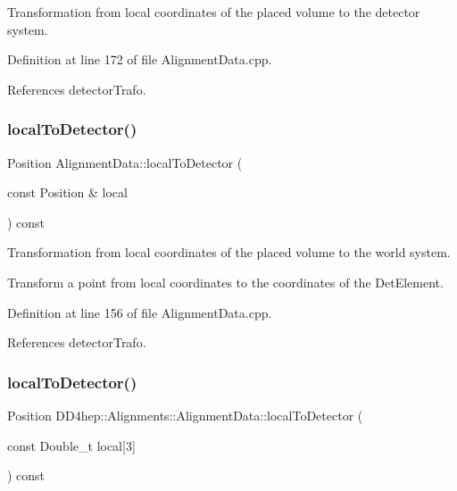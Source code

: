 Transformation from local coordinates of the placed volume to the detector system. 



Definition at line 172 of file Alignment\+Data.\+cpp.



References detector\+Trafo.

\hypertarget{class_d_d4hep_1_1_alignments_1_1_alignment_data_a686b7c5193c1d01d812b6d72f9a73c83}{}\label{class_d_d4hep_1_1_alignments_1_1_alignment_data_a686b7c5193c1d01d812b6d72f9a73c83} 
\subsubsection{\texorpdfstring{local\+To\+Detector()}{localToDetector()}\hspace{0.1cm}{\footnotesize\ttfamily [3/4]}}
{\footnotesize\ttfamily Position Alignment\+Data\+::local\+To\+Detector (\begin{DoxyParamCaption}\item[{const Position \&}]{local }\end{DoxyParamCaption}) const}



Transformation from local coordinates of the placed volume to the world system. 

Transform a point from local coordinates to the coordinates of the Det\+Element. 

Definition at line 156 of file Alignment\+Data.\+cpp.



References detector\+Trafo.

\hypertarget{class_d_d4hep_1_1_alignments_1_1_alignment_data_aa3d9d7b8ae5bf3cc2916a2fbd4d12cc4}{}\label{class_d_d4hep_1_1_alignments_1_1_alignment_data_aa3d9d7b8ae5bf3cc2916a2fbd4d12cc4} 
\subsubsection{\texorpdfstring{local\+To\+Detector()}{localToDetector()}\hspace{0.1cm}{\footnotesize\ttfamily [4/4]}}
{\footnotesize\ttfamily Position D\+D4hep\+::\+Alignments\+::\+Alignment\+Data\+::local\+To\+Detector (\begin{DoxyParamCaption}\item[{const Double\+\_\+t}]{local\mbox{[}3\mbox{]} }\end{DoxyParamCaption}) const\hspace{0.3cm}{\ttfamily [inline]}}



